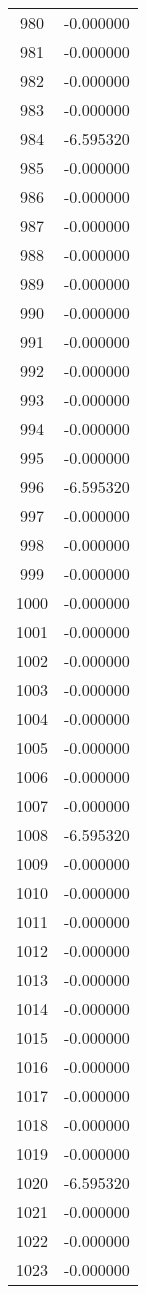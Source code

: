 \documentclass[12pt]{article}
\begin{document}
\begin{longtable}{@{}cc@{}}
980 & -0.000000 \\
981 & -0.000000 \\
982 & -0.000000 \\
983 & -0.000000 \\
984 & -6.595320 \\
985 & -0.000000 \\
986 & -0.000000 \\
987 & -0.000000 \\
988 & -0.000000 \\
989 & -0.000000 \\
990 & -0.000000 \\
991 & -0.000000 \\
992 & -0.000000 \\
993 & -0.000000 \\
994 & -0.000000 \\
995 & -0.000000 \\
996 & -6.595320 \\
997 & -0.000000 \\
998 & -0.000000 \\
999 & -0.000000 \\
1000 & -0.000000 \\
1001 & -0.000000 \\
1002 & -0.000000 \\
1003 & -0.000000 \\
1004 & -0.000000 \\
1005 & -0.000000 \\
1006 & -0.000000 \\
1007 & -0.000000 \\
1008 & -6.595320 \\
1009 & -0.000000 \\
1010 & -0.000000 \\
1011 & -0.000000 \\
1012 & -0.000000 \\
1013 & -0.000000 \\
1014 & -0.000000 \\
1015 & -0.000000 \\
1016 & -0.000000 \\
1017 & -0.000000 \\
1018 & -0.000000 \\
1019 & -0.000000 \\
1020 & -6.595320 \\
1021 & -0.000000 \\
1022 & -0.000000 \\
1023 & -0.000000 \\

\end{longtable}
\end{document}
